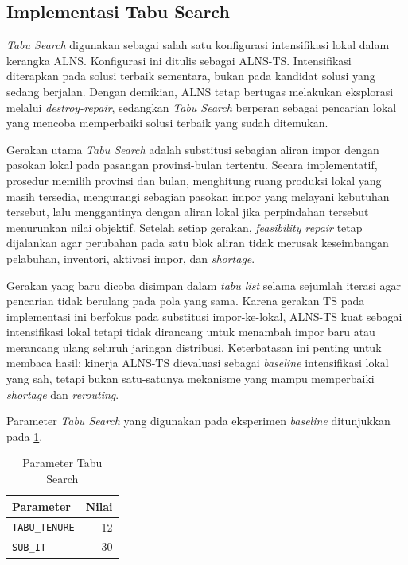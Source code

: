 \documentclass{file/TA-ITS}
\theoremstyle{definition}
\theoremstyle{definition}
\theoremstyle{plain}
\begin{document}
\subsection{Implementasi Tabu Search}

\textit{Tabu Search} digunakan sebagai salah satu konfigurasi intensifikasi lokal dalam kerangka ALNS. Konfigurasi ini ditulis sebagai ALNS-TS. Intensifikasi diterapkan pada solusi terbaik sementara, bukan pada kandidat solusi yang sedang berjalan. Dengan demikian, ALNS tetap bertugas melakukan eksplorasi melalui \textit{destroy-repair}, sedangkan \textit{Tabu Search} berperan sebagai pencarian lokal yang mencoba memperbaiki solusi terbaik yang sudah ditemukan.

Gerakan utama \textit{Tabu Search} adalah substitusi sebagian aliran impor dengan pasokan lokal pada pasangan provinsi-bulan tertentu. Secara implementatif, prosedur memilih provinsi dan bulan, menghitung ruang produksi lokal yang masih tersedia, mengurangi sebagian pasokan impor yang melayani kebutuhan tersebut, lalu menggantinya dengan aliran lokal jika perpindahan tersebut menurunkan nilai objektif. Setelah setiap gerakan, \textit{feasibility repair} tetap dijalankan agar perubahan pada satu blok aliran tidak merusak keseimbangan pelabuhan, inventori, aktivasi impor, dan \textit{shortage}.

Gerakan yang baru dicoba disimpan dalam \textit{tabu list} selama sejumlah iterasi agar pencarian tidak berulang pada pola yang sama. Karena gerakan TS pada implementasi ini berfokus pada substitusi impor-ke-lokal, ALNS-TS kuat sebagai intensifikasi lokal tetapi tidak dirancang untuk menambah impor baru atau merancang ulang seluruh jaringan distribusi. Keterbatasan ini penting untuk membaca hasil: kinerja ALNS-TS dievaluasi sebagai \textit{baseline} intensifikasi lokal yang sah, tetapi bukan satu-satunya mekanisme yang mampu memperbaiki \textit{shortage} dan \textit{rerouting}.

Parameter \textit{Tabu Search} yang digunakan pada eksperimen \textit{baseline} ditunjukkan pada \ref{tab:tabu_param}.

\begin{table}[H]
\centering
\caption{Parameter Tabu Search}
\label{tab:tabu_param}
\begin{tabular}{@{}lr@{}}
\toprule
\textbf{Parameter} & \textbf{Nilai} \\
\midrule
\texttt{TABU\_TENURE} & 12 \\
\texttt{SUB\_IT} & 30 \\
\bottomrule
\end{tabular}
\end{table}
\end{document}
